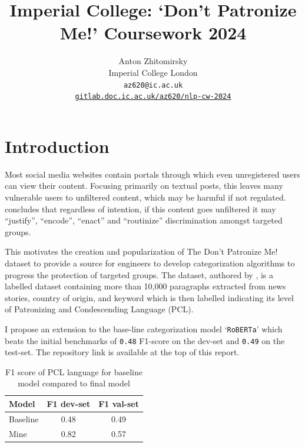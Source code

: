 \documentclass[11pt,a4paper]{article}
\title{Imperial College: `Don't Patronize Me!' Coursework 2024\\
}
\author{Anton Zhitomirsky \\
  Imperial College London \\
  \texttt{az620@ic.ac.uk} \\
  \href{https://gitlab.doc.ic.ac.uk/az620/nlp-cw-2024}{\texttt{gitlab.doc.ic.ac.uk/az620/nlp-cw-2024}}
}
\begin{document}
\maketitle

\section{Introduction}


Most social media websites contain portals through which even unregistered users can view their content. Focusing primarily on textual posts, this leaves many vulnerable users to unfiltered content, which may be harmful if not regulated. \citet{Ng-discrimination} concludes that regardless of intention, if this content goes unfiltered it may ``justify'', ``encode'', ``enact'' and ``routinize'' discrimination amongst targeted groups.

This motivates the creation and popularization of The Don't Patronize Me! dataset to provide a source for engineers to develop categorization algorithms to progress the protection of targeted groups. The dataset, authored by \citet{perez-almendros-etal-2020-dont}, is a labelled dataset containing more than 10,000 paragraphs extracted from news stories, country of origin, and keyword which is then labelled indicating its level of Patronizing and Condescending Language (PCL).

I propose an extension to the base-line categorization model `\texttt{RoBERTa}' which beats the initial benchmarks of \texttt{0.48} F1-score on the dev-set and \texttt{0.49} on the test-set. The repository link is available at the top of this report.

\begin{table}[!h]
    \centering
    \begin{tabular}{|l||c|c|}
        \hline
        Model & F1 dev-set & F1 val-set \\
        \hline
        \hline
        Baseline & 0.48 & 0.49 \\
        \hline
        Mine  & 0.82 & 0.57 \\
        \hline
    \end{tabular}
    \caption{F1 score of PCL language for baseline model compared to final model}    
\end{table}
\end{document}
